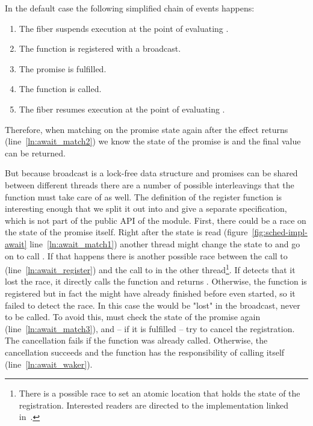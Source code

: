 In the default case the following simplified chain of events happens:
\begin{enumerate}
    \item The fiber suspends execution at the point of evaluating .
    \item The  function is registered with a broadcast.
    \item The promise is fulfilled.
    \item The  function is called.
    \item The fiber resumes execution at the point of evaluating .
\end{enumerate}
Therefore, when matching on the promise state again after the \esuspend{} effect returns (line~\ref{ln:await_match2}) we know the state of the promise is  and the final value can be returned.

But because broadcast is a lock-free data structure and promises can be shared between different threads there are a number of possible interleavings that the  function must take care of as well.
The definition of the register function is interesting enough that we split it out into  and give a separate specification, which is not part of the public API of the module.
First, there could be a race on the state of the promise itself.
Right after the state is read (figure~\ref{fig:sched-impl-await} line~\ref{ln:await_match1}) another thread might change the state to  and go on to call .
If that happens there is another possible race between the call to  (line~\ref{ln:await_register}) and the call to  in the other thread\footnote{There is a possible race to set an atomic location that holds the state of the registration. Interested readers are directed to the implementation linked in~\cite{koval2023cqs}.}.
If  detects that it lost the race, it directly calls the  function and returns .
Otherwise, the  function is registered but in fact the  might have already finished before  even started, so it failed to detect the race.
In this case the  would be "lost" in the broadcast, never to be called.
To avoid this,  must check the state of the promise again (line~\ref{ln:await_match3}), and -- if it is fulfilled -- try to cancel the  registration.
The cancellation fails if the  function was already called.
Otherwise, the cancellation succeeds and the  function has the responsibility of calling  itself (line~\ref{ln:await_waker}).

